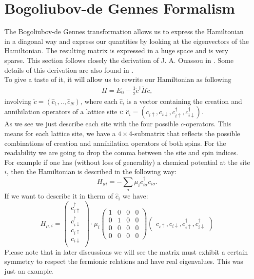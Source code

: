 \documentclass[../main.tex]{subfile}
\begin{document}
\section{Bogoliubov-de Gennes Formalism} \label{sec:BdGFormalism}
The Bogoliubov-de Gennes transformation allows us to express the Hamiltonian in a diagonal way and express our quantities 
by looking at the eigenvectors of the Hamiltonian. The resulting matrix is expressed in a huge space and is very sparse.
This section follows closely the derivation of J. A. Ouassou in \cite{Ouassou_unpubl}. Some details of this derivation are also found in \cite{Ouassou2024}.\\

To give a taste of it, it will allow us to rewrite our Hamiltonian as following
\begin{align}
    H = E_0 - \frac{1}{2} \check{c}^\dagger \check{H} \check{c}, \label{eq:BdG_intro_H}
\end{align}
involving $\check{c} = (\hat{c}_1,..,\hat{c}_N)$, where each $\hat{c}_i$ is a
 vector containing the creation and annihilation operators of a lattice site $i$:
$\hat{c}_i = (c_{i\uparrow} ,c_{i\downarrow}, c_{i\uparrow}^{\dagger} ,c_{i\downarrow}^{\dagger})$.\\

As we see we just describe each site with the four possible $c$-operators. This means for each lattice site,
we have a $4\times4$-submatrix that reflects the possible combinations of creation and annihilation operators of both spins. 
For the readability we are going to drop the comma between the site and spin indices.\\
For example if one has (without loss of generality) a chemical potential at the site $i$, 
 then the Hamiltonian is described in the following way:
\[
    H_{\mu i} = -\sum_{\sigma} \mu_i c_{i\sigma}^{\dagger} c_{i\sigma}.
\]
If we want to describe it in therm of $\hat{c}_i$ we have:
\[
    H_{\mu,i} = \begin{pmatrix}
        c_{i\uparrow}^{\dagger} \\c_{i\downarrow}^{\dagger}\\ c_{i\uparrow} \\c_{i\downarrow}\\
    \end{pmatrix}\cdot \mu_i
     \begin{pmatrix}
        1 & 0 & 0 & 0\\
        0 & 1 & 0 & 0\\
        0 & 0 & 0 & 0\\
        0 & 0 & 0 & 0
    \end{pmatrix}\begin{pmatrix}c_{i\uparrow} ,c_{i\downarrow}, c_{i\uparrow}^{\dagger} ,c_{i\downarrow}^{\dagger}\end{pmatrix}
\]
Please note that in later discussions we will see the matrix must exhibit a certain symmetry to respect the fermionic relations and have 
real eigenvalues. This was just an example.\\
\end{document}
